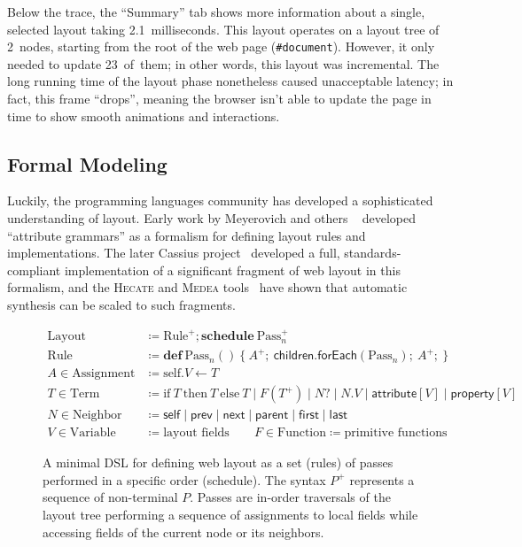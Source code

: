Below the trace, the ``Summary'' tab shows
  more information about a single, selected layout
  taking 2.1~milliseconds.
This layout operates
  on a layout tree of 2~nodes,
  starting from the root of the web page (\texttt{\#document}).
However, it only needed to update 23~of~them;
  in other words, this layout was incremental.
The long running time of the layout phase
  nonetheless caused unacceptable latency;
  in fact, this frame ``drops'',
  meaning the browser isn't able to update the page
  in time to show smooth animations and interactions.

\subsection{Formal Modeling}

Luckily, the programming languages community
  has developed a sophisticated understanding of layout.
Early work by Meyerovich and others%
  ~\cite{meyerovich-1,meyerovich-2,meyerovich-3}
  developed ``attribute grammars'' as a formalism
  for defining layout rules and implementations.
The later Cassius project~\cite{cassius-1,cassius-2,cassius-3}
  developed a full, standards-compliant implementation
  of a significant fragment of web layout in this formalism,
  and the \textsc{Hecate} and \textsc{Medea}
  tools~\cite{yufeng-1,yufeng-2}
  have shown that automatic synthesis can be scaled
  to such fragments.  

\begin{figure}
\begin{align*}
\text{Layout} &\coloneq  \text{Rule}^+; \textbf{schedule}\:\text{Pass}_n^+ \\
\text{Rule} &\coloneq
  \mathbf{def}\:\text{Pass}_n()\:\{\:
    A^+;\:
    \mathsf{children}.\mathsf{forEach}(\text{Pass}_n);\:
    A^+;\:
  \} \\
A \in \text{Assignment} &\coloneq
  \text{self}.V \leftarrow T \\[4pt]
T \in \text{Term} &\coloneq
  \text{if}\ T\ \text{then}\ T\ \text{else}\ T \mid
  F(T^+) \mid
  N? \mid
  N.V \mid
  \mathsf{attribute}[V] \mid
  \mathsf{property}[V] \\
N \in \text{Neighbor} &\coloneq
  \mathsf{self} \mid \mathsf{prev} \mid
  \mathsf{next} \mid \mathsf{parent} \mid
  \mathsf{first} \mid \mathsf{last} \\[4pt]
V \in \text{Variable} &\coloneq \text{layout fields} \quad\quad
F \in \text{Function} \coloneq \text{primitive functions}
\end{align*}
\caption{
  A minimal DSL for defining web layout
    as a set (\textsf{rules}) of passes
    performed in a specific order (\textsf{schedule}).
  The syntax $P^+$ represents a sequence of non-terminal $P$.
  Passes are in-order traversals of the layout tree
    performing a sequence of assignments to local fields
    while accessing fields of the current node or its neighbors.
}
\label{fig:dsl}
\end{figure}

